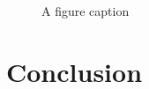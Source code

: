 \documentclass[a4paper,12pt,oneside,final]{report}
\newenvironment{changemargin}[2]{\begin{list}{}{%
\setlength{\topsep}{0pt}%
\setlength{\leftmargin}{0pt}%
\setlength{\rightmargin}{0pt}%
\setlength{\listparindent}{\parindent}%
\setlength{\itemindent}{\parindent}%
\setlength{\parsep}{0pt plus 1pt}%
\addtolength{\leftmargin}{#1}%
\addtolength{\rightmargin}{#2}%
}\item }{\end{list}}
\begin{document}
\begin{figure}[!h]
\begin{changemargin}{-20mm}{-20mm}
\center
\caption{A figure caption}
\end{changemargin}
\end{figure}

\paragraph{}
\chapter{Conclusion}
\paragraph{}




\begin{appendices}

\end{appendices}
\end{document}
